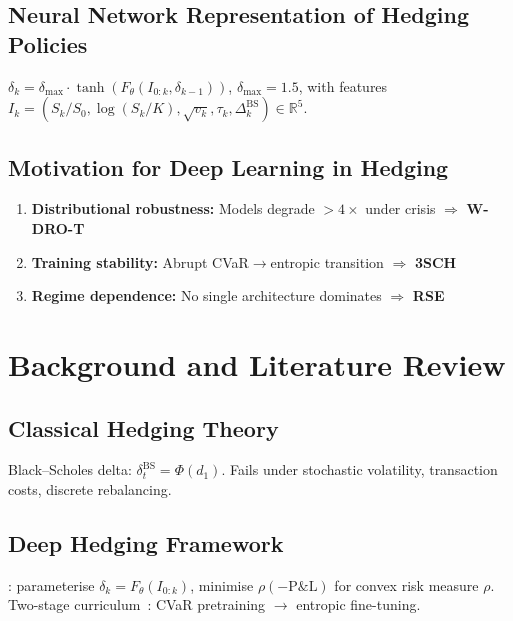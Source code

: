 \documentclass[11pt]{article}
\newcommand{\R}{\mathbb{R}}
\begin{document}
\subsection{Neural Network Representation of Hedging Policies}
$\delta_k = \delta_{\max} \cdot \tanh(F_\theta(I_{0:k}, \delta_{k-1}))$, $\delta_{\max}{=}1.5$, with features $I_k = (S_k/S_0, \log(S_k/K), \sqrt{v_k}, \tau_k, \Delta_k^{\mathrm{BS}}) \in \R^5$.

\subsection{Motivation for Deep Learning in Hedging}
\begin{posterbox}
\begin{enumerate}[noitemsep,leftmargin=*]
\item \textbf{Distributional robustness:} Models degrade $>4\times$ under crisis $\Rightarrow$ \textcolor{ppurple}{\textbf{W-DRO-T}}
\item \textbf{Training stability:} Abrupt CVaR$\to$entropic transition $\Rightarrow$ \textcolor{porange}{\textbf{3SCH}}
\item \textbf{Regime dependence:} No single architecture dominates $\Rightarrow$ \textcolor{pblue}{\textbf{RSE}}
\end{enumerate}
\end{posterbox}

\section{Background and Literature Review}

\subsection{Classical Hedging Theory}
Black--Scholes delta: $\delta_t^{\mathrm{BS}} = \Phi(d_1)$. Fails under stochastic volatility, transaction costs, discrete rebalancing.

\subsection{Deep Hedging Framework}
\citet{buehler2019deep}: parameterise $\delta_k = F_\theta(I_{0:k})$, minimise $\rho(-\mathrm{P\&L})$ for convex risk measure $\rho$. Two-stage curriculum~\citep{kozyra2019deep}: CVaR pretraining $\to$ entropic fine-tuning.
\end{document}
